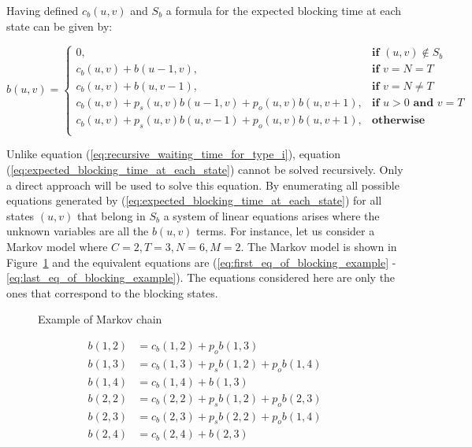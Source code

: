 Having defined \(c_b(u,v)\) and \(S_b\) a formula for the expected blocking time
at each state can be given by:

\small
\begin{equation}\label{eq:expected_blocking_time_at_each_state}
    b(u,v) =
    \begin{cases}
        0, & \textbf{if } (u,v) \notin S_b \\
        c_b(u,v) + b(u - 1, v), & \textbf{if } v = N = T\\
        c_b(u,v) + b(u, v-1), & \textbf{if } v = N \neq T \\
        c_b(u,v) + p_s(u,v) b(u-1, v) + p_o(u,v) b(u, v+1), & \textbf{if } u > 0
        \textbf{ and } v = T \\
        c_b(u,v) + p_s(u,v) b(u, v-1) + p_o(u,v) b(u, v+1), & \textbf{otherwise} \\
    \end{cases}
\end{equation}
\normalsize

Unlike equation (\ref{eq:recursive_waiting_time_for_type_i}), equation
(\ref{eq:expected_blocking_time_at_each_state}) cannot be solved recursively.
Only a direct approach will be used to solve this equation.
By enumerating all possible equations generated by
(\ref{eq:expected_blocking_time_at_each_state}) for all states \((u,v)\) that
belong in \(S_b\) a system of linear equations arises where the unknown
variables are all the \(b(u,v)\) terms.
For instance, let us consider a Markov model where \(C=2, T=3, N=6, M=2\).
The Markov model is shown in Figure~\ref{fig:example-algeb-blocking}
and the equivalent equations are
(\ref{eq:first_eq_of_blocking_example} - \ref{eq:last_eq_of_blocking_example}).
The equations considered here are only the ones that correspond to the blocking
states.


\begin{minipage}{0.45\textwidth}
    \begin{figure}[H]
        \scalebox{0.5}{}
        \caption{Example of Markov chain}
        \label{fig:example-algeb-blocking}
    \end{figure}
\end{minipage}
\begin{minipage}{0.5\textwidth}
    \footnotesize
    \begin{align}
        b(1,2) &= c_b(1,2) + p_o b(1,3) \label{eq:first_eq_of_blocking_example} \\
        b(1,3) &= c_b(1,3) + p_s b(1,2) + p_o b(1,4) \\
        b(1,4) &= c_b(1,4) + b(1,3) \\
        b(2,2) &= c_b(2,2) + p_s b(1,2) + p_o b(2,3) \\
        b(2,3) &= c_b(2,3) + p_s b(2,2) + p_o b(1,4) \\
        b(2,4) &= c_b(2,4) + b(2,3)\label{eq:last_eq_of_blocking_example}
    \end{align}
    \normalsize
\end{minipage}



